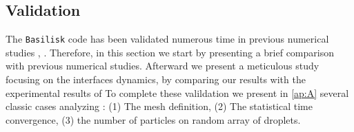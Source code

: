 
\subsection{Validation}
The \texttt{Basilisk} code has been validated numerous time in previous numerical studies \citet{innocenti2020direct},\citet{popinet2018numerical} . 
Therefore,  in this section we start by presenting a brief comparison with previous numerical studies. 
Afterward we present a meticulous study focusing on the interfaces dynamics, by comparing our results with the experimental results of \citet{mohamed2003drop} 
To complete these valildation we present in \ref{ap:A} several classic cases analyzing :
(1) The mesh definition, (2) The statistical time convergence, (3) the number of particles on random array of droplets. 
 
